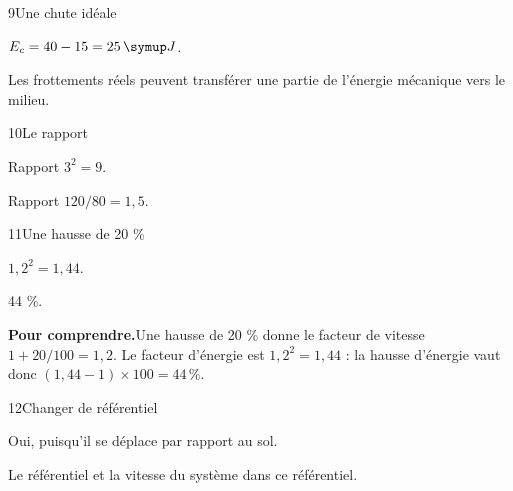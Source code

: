 \par\noindent\begin{minipage}{\linewidth}
\begin{corrige}{9}{Une chute idéale}
\begin{questions}
\item $E_c=40-15=25\unite J$.
\item Les frottements réels peuvent transférer une partie de l’énergie mécanique vers le milieu.
\end{questions}
\end{corrige}
\end{minipage}
\par\noindent\begin{minipage}{\linewidth}
\begin{corrige}{10}{Le rapport}
\begin{questions}
\item Rapport $3^2=9$.
\item Rapport $120/80=1{,}5$.
\end{questions}
\end{corrige}
\end{minipage}
\par\noindent\begin{minipage}{\linewidth}
\begin{corrige}{11}{Une hausse de 20 \%}
\begin{questions}
\item $1{,}2^2=1{,}44$.
\item 44 \%.
\end{questions}
\par\smallskip\noindent\textbf{Pour comprendre.}\enspace Une hausse de 20 \% donne le facteur de vitesse $1+20/100=1{,}2$. Le facteur d’énergie est $1{,}2^2=1{,}44$ : la hausse d’énergie vaut donc $(1{,}44-1)\times100=44\,\%$.\par
{}
\end{corrige}
\end{minipage}
\par\noindent\begin{minipage}{\linewidth}
\begin{corrige}{12}{Changer de référentiel}
\begin{questions}
\item Oui, puisqu’il se déplace par rapport au sol.
\item Le référentiel et la vitesse du système dans ce référentiel.
\end{questions}
\end{corrige}
\end{minipage}
